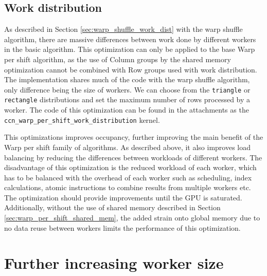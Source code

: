\subsection{Work distribution}
\label{sec:warp_per_shift_work_dist}

As described in Section \ref{sec:warp_shuffle_work_dist} with the warp shuffle algorithm, there are massive differences between work done by different workers in the basic algorithm. This optimization can only be applied to the base Warp per shift algorithm, as the use of Column groups by the shared memory optimization cannot be combined with Row groups used with work distribution. The implementation shares much of the code with the warp shuffle algorithm, only difference being the size of workers. We can choose from the \texttt{triangle} or \texttt{rectangle} distributions and set the maximum number of rows processed by a worker. The code of this optimization can be found in the attachments as the \texttt{ccn\_warp\_per\_shift\_work\_distribution} kernel.


This optimizations improves occupancy, further improving the main benefit of the Warp per shift family of algorithms. As described above, it also improves load balancing by reducing the differences between workloads of different workers. The disadvantage of this optimization is the reduced workload of each worker, which has to be balanced with the overhead of each worker such as scheduling, index calculations, atomic instructions to combine results from multiple workers etc. The optimization should provide improvements until the GPU is saturated. Additionally, without the use of shared memory described in Section \ref{sec:warp_per_shift_shared_mem}, the added strain onto global memory due to no data reuse between workers limits the performance of this optimization. 


\section{Further increasing worker size}
\label{sec:block_per_shift}


